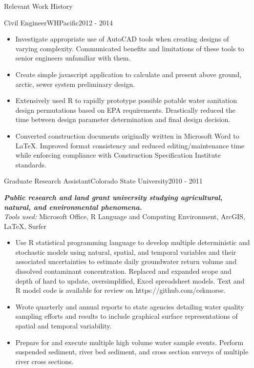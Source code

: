 \documentclass[]{mcdowellcv}
\newcommand{\smallspace}{\vspace{2pt}}
\newcommand{\compDesc}[1]{
	\textbf{\textit{#1}}
	\smallspace\\
}
\newcommand{\tools}[1]{
	\textit{Tools used: }#1
	\smallspace
}
\begin{document}
\begin{cvsection}{Relevant Work History}
\begin{cvsubsection}{Civil Engineer}{WHPacific}{2012 - 2014}
\begin{itemize}
			\smallspace
			\item Investigate appropriate use of AutoCAD tools when creating designs of varying complexity.  Communicated benefits and limitations of these tools to senior engineers unfamiliar with them.
			
			\smallspace
			\item Create simple javascript application to calculate and present above ground, arctic, sewer system preliminary design.
			
			\smallspace
			\item Extensively used \textsf{R} to rapidly prototype possible potable water sanitation design permutations based on EPA requirements.  Drastically reduced the time between design parameter determination and final design decision.
			
			\smallspace
			\item Converted construction documents originally written in Microsoft Word to \LaTeX. Improved format consistency and reduced editing/maintenance time while enforcing compliance with Construction Specification Institute standards.
		\end{itemize}
	\end{cvsubsection}

	\begin{cvsubsection}{Graduate Research Assistant}{Colorado State University}{2010 - 2011}
		\compDesc{Public research and land grant university studying agricultural, natural, and environmental phenomena.}
		\tools{Microsoft Office, \textsf{R} Language and Computing Environment, ArcGIS, \LaTeX, Surfer}
		\begin{itemize}
			\item Use \textsf{R} statistical programming language to develop multiple deterministic and stochastic models using natural, spatial, and temporal variables and their associated uncertainties to estimate daily groundwater return volume and dissolved contaminant concentration.  Replaced and expanded scope and depth of hard to update, oversimplified, Excel spreadsheet models. Text and \textsf{R} model code is available for review on https://github.com/cekmorse.
			
			\smallspace
			\item Wrote quarterly and annual reports to state agencies detailing water quality sampling efforts and results to include graphical surface representations of spatial and temporal variability.
			
			\smallspace
			\item Prepare for and execute multiple high volume water sample events. Perform suspended sediment, river bed sediment, and cross section surveys of multiple river cross sections.
			

\end{itemize}
\end{cvsubsection}
\end{cvsection}
\end{document}
